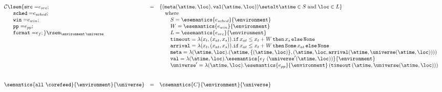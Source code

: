 
\newcommand{\rb}[1]{\raisebox{6ex}[0pt]{#1}}

\begin{figure*}[t]
\[
\begin{array}{lcl}

    {\cal C}\lsem\mathtt{\{ src=} e_{src}; 
 &=& \{( \mathtt{meta} (\atime,\loc), \mathtt{val} (\atime,\loc))
          \setalt \atime \in S
          \;\mbox{and}\; \loc \in  L
     \}
\\
 \quad\ \   \mathtt{sched=} e_{sched};
&&\quad\mbox{where} \\
 \quad\ \  \mathtt{win=} e_{win};
&& \qquad S = \esemantics{e_{sched}}{\environment} \\
 \quad\ \  \mathtt{pp=} e_{pp};
&& \qquad W = \esemantics{e_{win}}{\environment}\\
 \quad\ \  \mathtt{format=} e_{f}; \}\rsem_{{\environment} \,
   {\universe}}
&& \qquad L = \esemantics{e_{src}}{\environment}
\\
&& \qquad \mathtt{timeout} =  
     \lambda (x_t,(x_{at},x_s)).
        \mathtt{if}\, x_{at} \leq x_t + W \,
        \mathtt{then}\,  x_s \, \mathtt{else} \, \mathtt{None} 
\\
&& 
\qquad \mathtt{arrival} =  
     \lambda (x_t,(x_{at},x_s)).
        \mathtt{if}\, x_{at} \leq x_t + W \,
        \mathtt{then}\,  \mathtt{Some}\, x_{at} \, \mathtt{else} \, \mathtt{None} 
 \\
&& 
\qquad \mathtt{meta} =  
      \lambda (\atime,\loc).
       (\atime,\{(\atime,\loc)\}, (\atime,\loc,\mathtt{arrival}(\atime,\universe(\atime,\loc))))
\\
 && \qquad \mathtt{val} =
      \lambda (\atime, \loc).
             \esemantics{e_f\; (\universe'(\atime, \loc))}{\environment}
 \\
&& \qquad \universe' =
     \lambda (\atime, \loc). 
           \esemantics{e_{pp}}{\environment}\, 
                 (\mathtt{timeout}\, (\atime,\universe (\atime,\loc))) 

\\



\\\\

\semantics{\mathtt{all}\ \corefeed}{\environment}{\universe} 
&=& 
\csemantics{C}{\environment}{\universe}
\\\\



\end{array}\]
\end{figure*}

